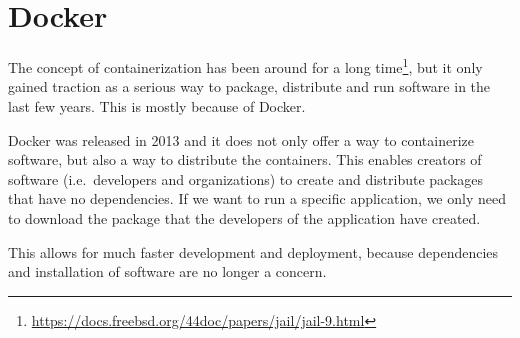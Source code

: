 \section{Docker}\label{background:docker}
The concept of containerization has been around for a long time\footnote{\url{https://docs.freebsd.org/44doc/papers/jail/jail-9.html}}, but it only gained traction as a serious way to package, distribute and run software in the last few years. This is mostly because of Docker.

\medskip

Docker was released in 2013 and it does not only offer a way to containerize software, but also a way to distribute the containers. This enables creators of software (i.e.\ developers and organizations) to create and distribute packages that have no dependencies. If we want to run a specific application, we only need to download the package that the developers of the application have created.

This allows for much faster development and deployment, because dependencies and installation of software are no longer a concern.










